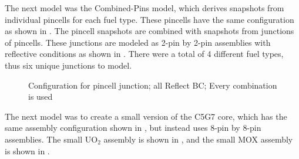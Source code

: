The next model was the Combined-Pins model, which 
derives snapshots from individual pincells for each fuel type.  These pincells have the same 
configuration as shown in .  
The pincell snapshots are combined with snapshots from junctions of pincells. 
These junctions are modeled as 2-pin by 2-pin assemblies with reflective 
conditions as shown in .  There were a total of 4 
different fuel types, thus six unique junctions to model.

\begin{figure*}[htb]
    \centering
    \caption{Configuration for pincell junction; all Reflect BC; Every 
        combination is used}
    \label{fig:junction_config}
\end{figure*}

The next model was to create a small version of the C5G7 core, which 
has the same assembly configuration shown in , but 
instead uses 8-pin by 8-pin assemblies.  The small UO$_2$ assembly is shown in 
, and the small MOX assembly is shown in  
. 

